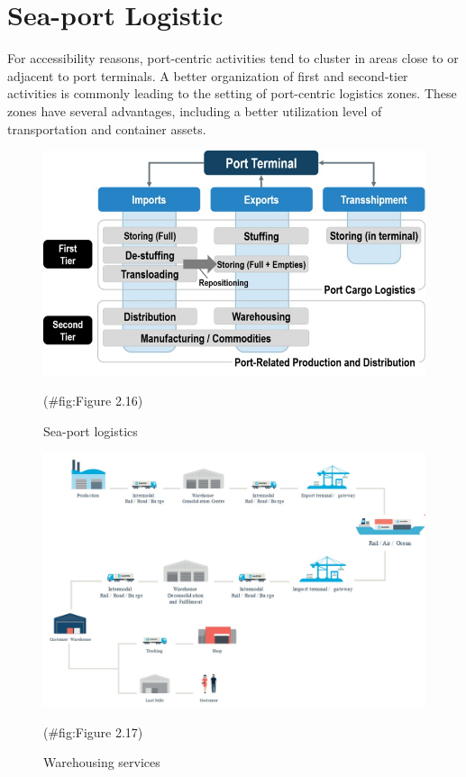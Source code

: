 \documentclass[
]{book}
\begin{document}
\hypertarget{intro-port_Logistic}{%
\section{Sea-port Logistic}\label{intro-port_Logistic}}

For accessibility reasons, port-centric activities tend to cluster in areas close to or adjacent to port terminals. A better organization of first and second-tier activities is commonly leading to the setting of port-centric logistics zones. These zones have several advantages, including a better utilization level of transportation and container assets.

\begin{figure}

{\centering \includegraphics{./Images/Intro/Sea-port logistics} 

}

\caption{Sea-port logistics}(\#fig:Figure 2.16)
\end{figure}

\begin{figure}

{\centering \includegraphics{./Images/Intro/Warehousing services} 

}

\caption{Warehousing services}(\#fig:Figure 2.17)
\end{figure}
\end{document}
